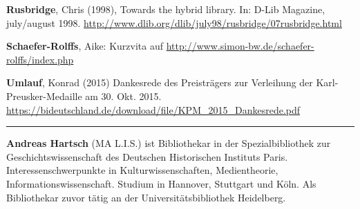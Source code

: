\documentclass[a4paper,
fontsize=11pt,
oneside,
numbers=noperiodatend,
parskip=half-,
bibliography=totoc,
final
]{scrartcl}
\begin{document}
\textbf{Rusbridge}, Chris (1998), Towards the hybrid library. In: D-Lib
Magazine, july/august 1998.
\url{http://www.dlib.org/dlib/july98/rusbridge/07rusbridge.html}

\textbf{Schaefer-Rolffs}, Aike: Kurzvita auf
\url{http://www.simon-bw.de/schaefer-rolffs/index.php}

\textbf{Umlauf}, Konrad (2015) Dankesrede des Preisträgers zur
Verleihung der Karl-Preusker-Medaille am 30. Okt. 2015.
\url{https://bideutschland.de/download/file/KPM_2015_Dankesrede.pdf}

\begin{center}\rule{0.5\linewidth}{\linethickness}\end{center}

\textbf{Andreas Hartsch} (MA L.I.S.) ist Bibliothekar in der
Spezialbibliothek zur Geschichtswissenschaft des Deutschen Historischen
Instituts Paris. Interessenschwerpunkte in Kulturwissenschaften,
Medientheorie, Informationswissenschaft. Studium in Hannover, Stuttgart
und Köln. Als Bibliothekar zuvor tätig an der Universitätsbibliothek
Heidelberg.
\end{document}
